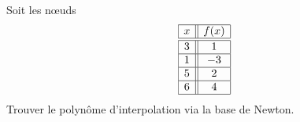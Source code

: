 
\begin{exercice}\label{exomazhe-0005}

    Soit les nœuds
    \begin{equation*}
        \begin{array}[]{|c||c|}
            \hline
            x&f(x)\\
            \hline\hline
            3&1\\
            \hline
            1&-3\\
            \hline
            5&2\\
            \hline
            6&4\\
            \hline
        \end{array}
    \end{equation*}
    Trouver le polynôme d'interpolation via la base de Newton.

\end{exercice}
